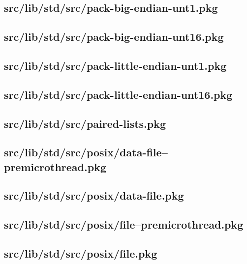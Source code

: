 \subsection{src/lib/std/src/pack-big-endian-unt1.pkg}


\subsection{src/lib/std/src/pack-big-endian-unt16.pkg}


\subsection{src/lib/std/src/pack-little-endian-unt1.pkg}


\subsection{src/lib/std/src/pack-little-endian-unt16.pkg}


\subsection{src/lib/std/src/paired-lists.pkg}


\subsection{src/lib/std/src/posix/data-file--premicrothread.pkg}


\subsection{src/lib/std/src/posix/data-file.pkg}


\subsection{src/lib/std/src/posix/file--premicrothread.pkg}


\subsection{src/lib/std/src/posix/file.pkg}


